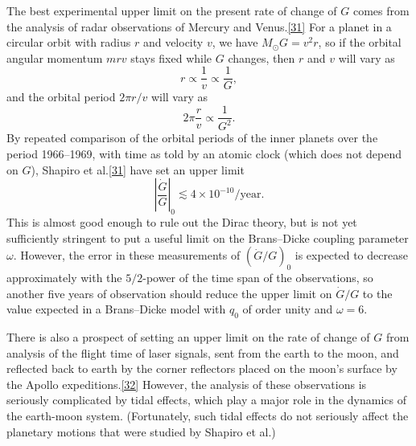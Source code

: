 The best experimental upper limit on the present rate of change of \(G\) comes
from the analysis of radar observations of Mercury and
Venus.\hyperref[ch16-ref-31]{[31]} For a planet in a circular orbit with
radius \(r\) and velocity \(v\), we have \(M_\odot G=v^2r\), so if the orbital
angular momentum \(mrv\) stays fixed while \(G\) changes, then \(r\) and \(v\)
will vary as
\begin{equation}
  r\propto\frac1v\propto\frac1G,
  \tag{16.4.43}\label{eq:16.4.43}
\end{equation}
and the orbital period \(2\pi r/v\) will vary as
\begin{equation}
  2\pi\frac rv\propto\frac1{G^2}.
  \tag{16.4.44}\label{eq:16.4.44}
\end{equation}
By repeated comparison of the orbital periods of the inner planets over the
period 1966--1969, with time as told by an atomic clock (which does not depend
on \(G\)), Shapiro et al.\hyperref[ch16-ref-31]{[31]} have set an upper limit
\[
  \left\lvert\frac{\dot G}{G}\right\rvert_0
  \lesssim
  4\times10^{-10}/\mathrm{year}.
\]
This is almost good enough to rule out the Dirac theory, but is not yet
sufficiently stringent to put a useful limit on the Brans--Dicke coupling
parameter \(\omega\). However, the error in these measurements of
\((\dot G/G)_0\) is expected to decrease approximately with the
\(5/2\)-power of the time span of the observations, so another five years of
observation should reduce the upper limit on \(\dot G/G\) to the value
expected in a Brans--Dicke model with \(q_0\) of order unity and \(\omega=6\).

There is also a prospect of setting an upper limit on the rate of change of
\(G\) from analysis of the flight time of laser signals, sent from the earth to
the moon, and reflected back to earth by the corner reflectors placed on the
moon's surface by the Apollo expeditions.\hyperref[ch16-ref-32]{[32]} However,
the analysis of these observations is seriously complicated by tidal effects,
which play a major role in the dynamics of the earth-moon system.
(Fortunately, such tidal effects do not seriously affect the planetary motions
that were studied by Shapiro et al.)

